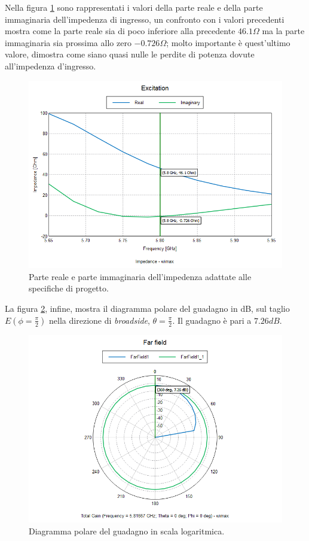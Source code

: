 Nella figura \ref{img:impopt} sono rappresentati i valori della parte reale e della parte immaginaria dell'impedenza di ingresso, un confronto con i valori precedenti mostra come la parte reale sia di poco inferiore alla precedente $46.1 \Omega$ ma la parte immaginaria sia prossima allo zero $-0.726 \Omega$; molto importante è quest'ultimo valore, dimostra come siano quasi nulle le perdite di potenza dovute all'impedenza d'ingresso. \\[1cm]

\begin{figure}
\centering
\caption{Parte reale e parte immaginaria dell'impedenza adattate alle specifiche di progetto.}
\label{img:impopt}
\includegraphics[scale=0.5]{Immagini/impedance_optimized}
\end{figure}

La figura \ref{img:polar}, infine, mostra il diagramma polare del guadagno in dB, sul taglio $E(\phi=\frac{\pi}{2})$ nella direzione di \emph{broadside}, $\theta = \frac{\pi}{2}$. Il guadagno è pari a $7.26 dB$.

\begin{figure}
\centering
\caption{Diagramma polare del guadagno in scala logaritmica.}
\label{img:polar}
\includegraphics[scale=0.5]{Immagini/total_gain_optimized}
\end{figure}